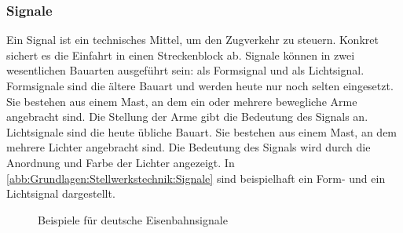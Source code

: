 \subsubsection*{Signale}\label{text:Grundlagen:Stellwerkstechnik:Sicherung-des-Schienenverkehrs:Signale}

Ein Signal ist ein technisches Mittel, um den Zugverkehr zu steuern. Konkret sichert es die Einfahrt in einen Streckenblock ab. Signale können in zwei wesentlichen Bauarten ausgeführt sein: als Formsignal und als Lichtsignal. Formsignale sind die ältere Bauart und werden heute nur noch selten eingesetzt. Sie bestehen aus einem Mast, an dem ein oder mehrere bewegliche Arme angebracht sind. Die Stellung der Arme gibt die Bedeutung des Signals an. Lichtsignale sind die heute übliche Bauart. Sie bestehen aus einem Mast, an dem mehrere Lichter angebracht sind. Die Bedeutung des Signals wird durch die Anordnung und Farbe der Lichter angezeigt. In \autoref{abb:Grundlagen:Stellwerkstechnik:Signale} sind beispielhaft ein Form- und ein Lichtsignal dargestellt.

\begin{figure}[H]
    \centering
    \qquad
    \caption{Beispiele für deutsche Eisenbahnsignale}\label{abb:Grundlagen:Stellwerkstechnik:Signale}
\end{figure}

